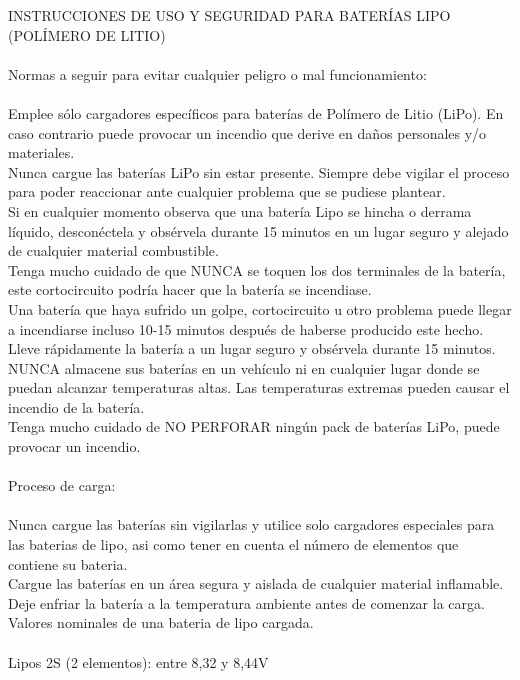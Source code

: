 \documentclass[a4paper]{book}
\begin{document}
INSTRUCCIONES DE USO Y SEGURIDAD PARA BATERÍAS LIPO (POLÍMERO DE LITIO)\\
\\
Normas a seguir para evitar cualquier peligro o mal funcionamiento:\\
\\
    Emplee sólo cargadores específicos para baterías de Polímero de Litio (LiPo). En caso contrario puede provocar un incendio que derive en daños personales y/o materiales.\\
    Nunca cargue las baterías LiPo sin estar presente. Siempre debe vigilar el proceso para poder reaccionar ante cualquier problema que se pudiese plantear.\\
    Si en cualquier momento observa que una batería Lipo se hincha o derrama líquido, desconéctela y obsérvela durante 15 minutos en un lugar seguro y alejado de cualquier material combustible.\\
    Tenga mucho cuidado de que NUNCA se toquen los dos terminales de la batería, este cortocircuito podría hacer que la batería se incendiase.\\
    Una batería que haya sufrido un golpe, cortocircuito u otro problema puede llegar a incendiarse incluso 10-15 minutos después de haberse producido este hecho. Lleve rápidamente la batería a un lugar seguro y obsérvela durante 15 minutos.\\
    NUNCA almacene sus baterías en un vehículo ni en cualquier lugar donde se puedan alcanzar temperaturas altas. Las temperaturas extremas pueden causar el incendio de la batería.\\
    Tenga mucho cuidado de NO PERFORAR ningún pack de baterías LiPo, puede provocar un incendio.\\
    \\
Proceso de carga:\\
\\
    Nunca cargue las baterías sin vigilarlas y utilice solo cargadores especiales para las baterias de lipo, asi como tener en cuenta el número de elementos que contiene su bateria.\\
    Cargue las baterías en un área segura y aislada de cualquier material inflamable.\\
    Deje enfriar la batería a la temperatura ambiente antes de comenzar la carga.\\
    Valores nominales de una bateria de lipo cargada.\\
\\
    Lipos 2S (2 elementos): entre 8,32 y 8,44V\\
\end{document}
